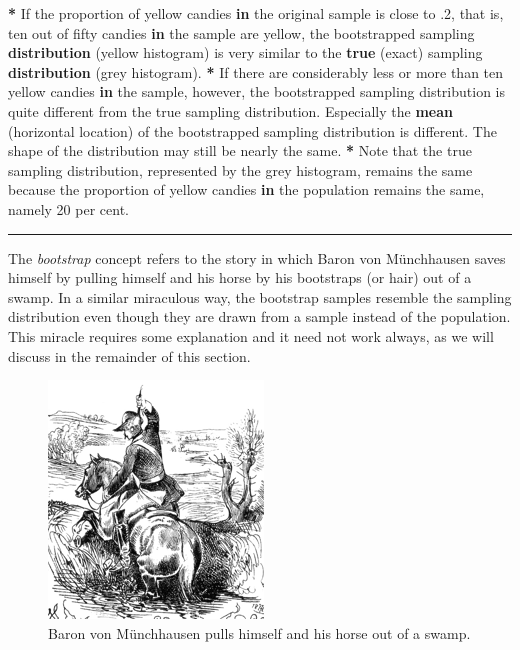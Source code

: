 \documentclass[a4paper]{book}
\newenvironment{Shaded}{\begin{snugshade}}{\end{snugshade}}
\newcommand{\KeywordTok}[1]{\textcolor[rgb]{0,0,0}{\textbf{#1}}}
\newcommand{\DecValTok}[1]{\textcolor[rgb]{0.00,0.00,0.00}{#1}}
\newcommand{\StringTok}[1]{\textcolor[rgb]{0.00,0.00,0.00}{#1}}
\newcommand{\ControlFlowTok}[1]{\textcolor[rgb]{0.00,0.00,0.00}{\textbf{#1}}}
\newcommand{\OperatorTok}[1]{\textcolor[rgb]{0.00,0.00,0.00}{\textbf{#1}}}
\newcommand{\NormalTok}[1]{#1}
\theoremstyle{definition}
\theoremstyle{definition}
\theoremstyle{definition}
\theoremstyle{remark}
\begin{document}
\begin{Shaded}
\begin{Highlighting}[]
\OperatorTok{*}\StringTok{ }\NormalTok{If the proportion of yellow candies }\ControlFlowTok{in}\NormalTok{ the original sample is}
\NormalTok{close to .}\DecValTok{2}\NormalTok{, that is, ten out of fifty candies }\ControlFlowTok{in}\NormalTok{ the sample are yellow, the}
\NormalTok{bootstrapped sampling }\KeywordTok{distribution}\NormalTok{ (yellow histogram) is very similar to the}
\KeywordTok{true}\NormalTok{ (exact) sampling }\KeywordTok{distribution}\NormalTok{ (grey histogram).}
\OperatorTok{*}\StringTok{ }\NormalTok{If there are considerably less or more than ten yellow candies }\ControlFlowTok{in}\NormalTok{ the sample,}
\NormalTok{however, the bootstrapped sampling distribution is quite different from the}
\NormalTok{true sampling distribution. Especially the }\KeywordTok{mean}\NormalTok{ (horizontal location) of the}
\NormalTok{bootstrapped sampling distribution is different. The shape of the distribution}
\NormalTok{may still be nearly the same.}
\OperatorTok{*}\StringTok{ }\NormalTok{Note that the true sampling distribution, represented by the grey histogram,}
\NormalTok{remains the same because the proportion of yellow candies }\ControlFlowTok{in}\NormalTok{ the population}
\NormalTok{remains the same, namely }\DecValTok{20}\NormalTok{ per cent.}
\end{Highlighting}
\end{Shaded}

\begin{center}\rule{0.5\linewidth}{\linethickness}\end{center}

The \emph{bootstrap} concept refers to the story in which Baron von
Münchhausen saves himself by pulling himself and his horse by his
bootstraps (or hair) out of a swamp. In a similar miraculous way, the
bootstrap samples resemble the sampling distribution even though they
are drawn from a sample instead of the population. This miracle requires
some explanation and it need not work always, as we will discuss in the
remainder of this section.

\begin{figure}[H]
\centering
\includegraphics{figures/Munchhausen.png}
\caption{Baron von Münchhausen pulls himself and his horse out of a
swamp.}
\end{figure}
\end{document}

